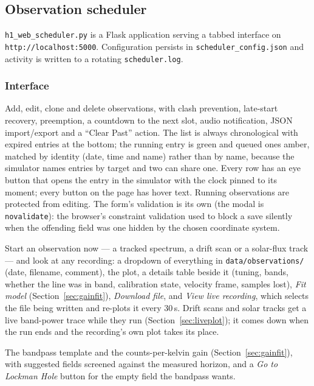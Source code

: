 \documentclass[11pt,a4paper]{article}
\begin{document}
\subsection{Observation scheduler}

\texttt{h1\_web\_scheduler.py} is a Flask application serving a tabbed interface on \texttt{http://localhost:5000}. Configuration persists in \texttt{scheduler\_config.json} and activity is written to a rotating \texttt{scheduler.log}.

\subsubsection{Interface}

\begin{description}[style=nextline]
    \item[Scheduler tab] Add, edit, clone and delete observations, with clash prevention, late-start recovery, preemption, a countdown to the next slot, audio notification, JSON import/export and a ``Clear Past'' action. The list is always chronological with expired entries at the bottom; the running entry is green and queued ones amber, matched by identity (date, time and name) rather than by name, because the simulator names entries by target and two can share one. Every row has an eye button that opens the entry in the simulator with the clock pinned to its moment; every button on the page has hover text. Running observations are protected from editing. The form's validation is its own (the modal is \texttt{novalidate}): the browser's constraint validation used to block a save silently when the offending field was one hidden by the chosen coordinate system.
    \item[Observe tab] Start an observation now --- a tracked spectrum, a drift scan or a solar-flux track --- and look at any recording: a dropdown of everything in \texttt{data/observations/} (date, filename, comment), the plot, a details table beside it (tuning, bands, whether the line was in band, calibration state, velocity frame, samples lost), \emph{Fit model} (Section~\ref{sec:gainfit}), \emph{Download file}, and \emph{View live recording}, which selects the file being written and re-plots it every 30\,s. Drift scans and solar tracks get a live band-power trace while they run (Section~\ref{sec:liveplot}); it comes down when the run ends and the recording's own plot takes its place.
    \item[RF calibration tab] The bandpass template and the counts-per-kelvin gain (Section~\ref{sec:gainfit}), with suggested fields screened against the measured horizon, and a \emph{Go to Lockman Hole} button for the empty field the bandpass wants.

\end{description}
\end{document}
